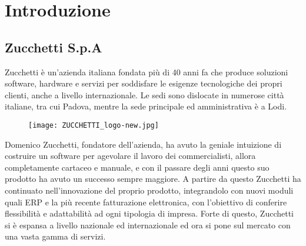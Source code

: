 
\chapter{Introduzione}
\label{cap:introduzione}





\section{Zucchetti S.p.A}
Zucchetti è un'azienda italiana fondata più di 40 anni fa che produce soluzioni software, hardware e servizi per soddisfare le esigenze tecnologiche dei propri clienti, anche a livello internazionale. Le sedi sono dislocate in numerose città italiane, tra cui Padova, mentre la sede principale ed amministrativa è a Lodi.


\begin{figure}[htbp]
	\begin{center}
		\texttt{[image: ZUCCHETTI\_logo-new.jpg]}
	\end{center}
\end{figure}

Domenico Zucchetti, fondatore dell'azienda, ha avuto la geniale intuizione di costruire un software per agevolare il lavoro dei commercialisti, allora completamente cartaceo e manuale, e con il passare degli anni questo suo prodotto ha avuto un successo sempre maggiore. A partire da questo Zucchetti ha continuato nell'innovazione del proprio prodotto, integrandolo con nuovi moduli quali ERP e la più recente fatturazione elettronica, con l'obiettivo di conferire flessibilità e adattabilità ad ogni tipologia di impresa. Forte di questo, Zucchetti si è espansa a livello nazionale ed internazionale ed ora si pone sul mercato con una vasta gamma di servizi.

